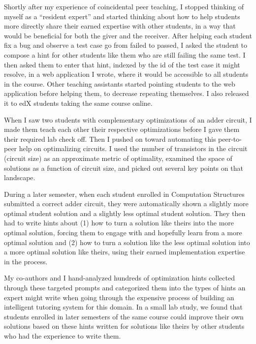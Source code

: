 Shortly after my experience of coincidental peer teaching, I stopped thinking of myself as a ``resident expert'' and started thinking about how to help students more directly share their earned expertise with other students, in a way that would be beneficial for both the giver and the receiver. After helping each student fix a bug and observe a test case go from failed to passed, I asked the student to compose a hint for other students like them who are still failing the same test. I then asked them to enter that hint, indexed by the id of the test case it might resolve, in a web application I wrote, where it would be accessible to all students in the course. Other teaching assistants started pointing students to the web application before helping them, to decrease repeating themselves. I also released it to edX students taking the same course online. 

When I saw two students with complementary optimizations of an adder circuit, I made them teach each other their respective optimizations before I gave them their required lab check off. Then I pushed on toward automating this peer-to-peer help on optimalizing circuits. I used the number of transistors in the circuit (circuit size) as an approximate metric of optimality, examined the space of solutions as a function of circuit size, and picked out several key points on that landscape. 

During a later semester, when each student enrolled in Computation Structures submitted a correct adder circuit, they were automatically shown a slightly more optimal student solution and a slightly less optimal student solution. They then had to write hints about (1) how to turn a solution like theirs into the more optimal solution, forcing them to engage with and hopefully learn from a more optimal solution and (2) how to turn a solution like the less optimal solution into a more optimal solution like theirs, using their earned implementation expertise in the process. 

My co-authors and I hand-analyzed hundreds of optimization hints collected through these targeted prompts and categorized them into the types of hints an expert might write when going through the expensive process of building an intelligent tutoring system for this domain. In a small lab study, we found that students enrolled in later semesters of the same course could improve their own solutions based on these hints written for solutions like theirs by other students who had the experience to write them. 

